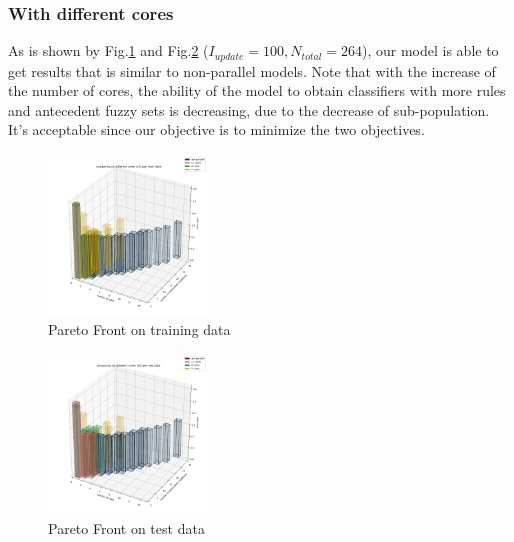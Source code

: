 \documentclass[conference]{IEEEtran}
\begin{document}
  \subsubsection{With different cores}
As is shown by Fig.\ref{diffCoreTr} and Fig.\ref{diffCoreT} ($I_{update} = 100, N_{total} = 264$), our model is able to get results that is similar to non-parallel models. Note that with the increase of the number of cores, the ability of the model to obtain classifiers with more rules and antecedent fuzzy sets is decreasing, due to the decrease of sub-population. It's acceptable since our objective is to minimize the two objectives.
  \begin{figure}[H]
    \centering
    \includegraphics[width=0.38\textwidth]{figures/diffCoreTrain.png}
    \caption{Pareto Front on training data}\label{diffCoreTr}
  \end{figure}
  \begin{figure}[H]
    \centering
    \includegraphics[width=0.38\textwidth]{figures/diffCoreTest.png}
    \caption{Pareto Front on test data}\label{diffCoreT}
  \end{figure}
  
  
  
\end{document}
